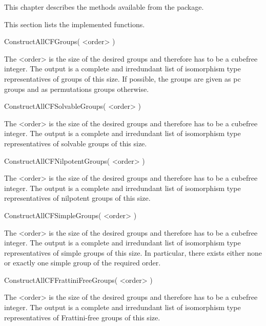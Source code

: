 


This chapter describes the methods available from the {\Cubefree} package.




This section lists the implemented functions.


\>ConstructAllCFGroups( <order> ) 

The <order> is the size of the desired groups and therefore has to be a
cubefree integer. The output is a complete and irredundant list of isomorphism
type representatives of groups of this size. If possible, the groups are given
as pc groups and as permutations groups otherwise.

\>ConstructAllCFSolvableGroups( <order> ) 

The <order> is the size of the desired groups and therefore has to be a
cubefree integer. The output is a complete and irredundant list of isomorphism
type representatives of solvable groups of this size.

\>ConstructAllCFNilpotentGroups( <order> ) 

The <order> is the size of the desired groups and therefore has to be a
cubefree integer. The output is a complete and irredundant list of isomorphism
type representatives of nilpotent groups of this size.

\>ConstructAllCFSimpleGroups( <order> ) 

The <order> is the size of the desired groups and therefore has to be a
cubefree integer. The output is a complete and irredundant list of isomorphism
type representatives of simple groups of this size. In particular, there
exists either none or exactly one simple group of the required order.

\>ConstructAllCFFrattiniFreeGroups( <order> ) 

The <order> is the size of the desired groups and therefore has to be a
cubefree integer. The output is a complete and irredundant list of isomorphism
type representatives of Frattini-free groups of this size.


